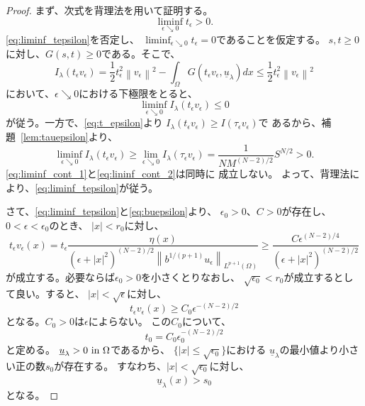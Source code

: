 \begin{proof}
まず、次式を背理法を用いて証明する。
\begin{equation}
 \liminf_{\epsilon \searrow 0} t_\epsilon > 0. \label{eq:liminf_tepsilon}
\end{equation}
\eqref{eq:liminf_tepsilon}を否定し、
$\liminf_{\epsilon \searrow 0} t_\epsilon = 0$であることを仮定する。
$s, t \geq 0$に対し、$G(s, t) \geq 0$である。そこで、
\begin{equation}
 I_\lambda(t_\epsilon v_\epsilon) = \frac{1}{2} t_\epsilon^2 \left\|
                                                              v_\epsilon
                                                             \right\|^2
 - \int_\Omega G(t_\epsilon v_\epsilon, \underline{u}_\lambda) dx \leq
 \frac{1}{2} t_\epsilon^2 \left\| v_\epsilon \right\|^2
\end{equation}
において、$\epsilon \searrow 0$における下極限をとると、
\begin{equation}
 \liminf_{\epsilon \searrow 0} I_\lambda (t_\epsilon v_\epsilon) \leq
  0 \label{eq:liminf_cont_1}
\end{equation}
が従う。一方で、\eqref{eq:t_epsilon}より
$I_\lambda(t_\epsilon v_\epsilon) \geq I(\tau_\epsilon v_\epsilon)$で
あるから、補題~\ref{lem:tauepsilon}より、
\begin{equation}
  \liminf_{\epsilon \searrow 0} I_\lambda(t_\epsilon v_\epsilon) \geq
 \lim_{\epsilon \searrow 0} I_\lambda (\tau_\epsilon v_\epsilon) =
 \frac{1}{NM^{(N-2)/2}} S^{N/2} > 0. \label{eq:lininf_cont_2}
\end{equation}
\eqref{eq:liminf_cont_1}と\eqref{eq:lininf_cont_2}は同時に
成立しない。
よって、背理法により、\eqref{eq:liminf_tepsilon}が従う。 

さて、\eqref{eq:liminf_tepsilon}と\eqref{eq:buepsilon}より、
$\epsilon_0 > 0$、$C > 0$が存在し、$0 <\epsilon < \epsilon_0$のとき、
$\lvert x \rvert < r_0$に対し、
\begin{equation}
 t_\epsilon v_\epsilon (x) = t_\epsilon \frac{\eta(x)}{(\epsilon +
 \lvert x \rvert^2)^{(N-2)/2} \left\| b^{1/(p+1)} u_\epsilon
 \right\|_{L^{p+1}(\Omega)}} \geq \frac{C
 \epsilon^{(N-2)/4}}{(\epsilon + \lvert x \rvert^2)^{(N-2)/2}} 
 \label{eq:teve_p}
\end{equation}
が成立する。必要ならば$\epsilon_0 > 0$を小さくとりなおし、
$\sqrt{\epsilon_0} < r_0$が成立するとして良い。すると、
$\lvert x \lvert < \sqrt{\epsilon}$に対し、
\begin{equation}
 t_\epsilon v_\epsilon (x) \geq C_0 \epsilon^{-(N-2)/2} \label{eq:teve}
\end{equation}
となる。$C_0 > 0$は$\epsilon$によらない。
この$C_0$について、
\begin{equation}
 t_0 = C_0 \epsilon_0^{-(N-2)/2} \label{eq:t_0_epsilon}
\end{equation}
と定める。
$\underline{u}_\lambda > 0 ~\text{in}~ \Omega$であるから、
$\{ \lvert x \rvert \leq \sqrt{\epsilon_0} \}$における
$\underline{u}_\lambda$の最小値より小さい正の数$s_0$が存在する。
すなわち、$\lvert x \rvert < \sqrt{\epsilon_0}$に対し、
\begin{equation}
 \underline{u}_\lambda (x) > s_0 \label{eq:uus_0}
\end{equation}
となる。


\end{proof}
